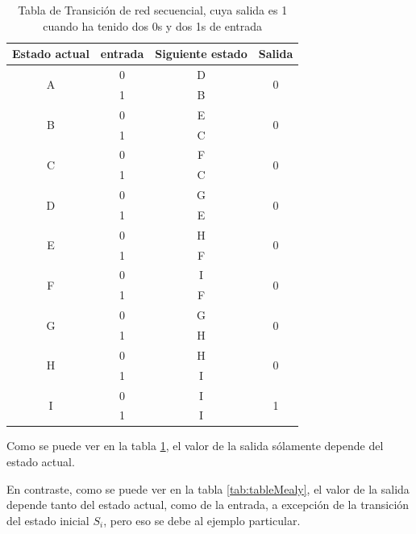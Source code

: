 \documentclass[journal,trans]{IEEEtran}
\begin{document}
	\begin{table}[h]
		\centering
		\bgroup
		\def\arraystretch{1.5}
		\begin{tabular}{|c|c|c|c|}
			\hline
			Estado actual & entrada & Siguiente estado & Salida \\
			\hline
			\multirow{2}{*}{A} & 0 & D & \multirow{2}{*}{0} \\
			\cline{2-3}
			& 1 & B & \\
			\hline
			\multirow{2}{*}{B} & 0 & E & \multirow{2}{*}{0} \\
			\cline{2-3}
			& 1 & C & \\
			\hline
			\multirow{2}{*}{C} & 0 & F & \multirow{2}{*}{0} \\
			\cline{2-3}
			& 1 & C & \\
			\hline
			\multirow{2}{*}{D} & 0 & G & \multirow{2}{*}{0} \\
			\cline{2-3}
			& 1 & E & \\
			\hline
			\multirow{2}{*}{E} & 0 & H & \multirow{2}{*}{0} \\
			\cline{2-3}
			& 1 & F & \\
			\hline
			\multirow{2}{*}{F} & 0 & I & \multirow{2}{*}{0} \\
			\cline{2-3}
			& 1 & F & \\
			\hline
			\multirow{2}{*}{G} & 0 & G & \multirow{2}{*}{0} \\
			\cline{2-3}
			& 1 & H & \\
			\hline
			\multirow{2}{*}{H} & 0 & H & \multirow{2}{*}{0} \\
			\cline{2-3}
			& 1 & I & \\
			\hline
			\multirow{2}{*}{I} & 0 & I & \multirow{2}{*}{1} \\
			\cline{2-3}
			& 1 & I & \\
			\hline
		\end{tabular}
		\egroup
		\caption{Tabla de Transición de red secuencial, cuya salida es 1 cuando ha tenido dos 0s y dos 1s de entrada}
		\label{tab:MooreTable}
	\end{table}
	
	Como se puede ver en la tabla \ref{tab:MooreTable}, el valor de la salida s\'olamente depende del estado actual.
	
	En contraste, como se puede ver en la tabla \ref{tab:tableMealy}, el valor de la salida depende tanto del estado actual, como de la entrada, a excepción de la transición del estado inicial $S_{i}$, pero eso se debe al ejemplo particular.
	
\end{document}
